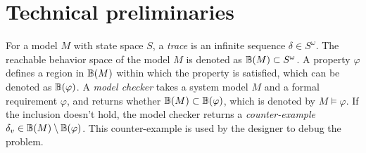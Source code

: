 \section{Technical preliminaries}
\label{preliminaries}
For a model $M$ with state space $S$, a \emph{trace} is an infinite sequence $\delta\in S^\omega$. 
The reachable behavior space of the model $M$ is denoted as $\mathbb{B}(M)\subset S^\omega$. 
A property $\varphi$ defines a region in $\mathbb{B}(M)$ within which the property is satisfied, which can be denoted as $\mathbb{B}(\varphi)$.
A \emph{model checker} takes a system model $M$ and a formal requirement $\varphi$, and returns whether $\mathbb{B}(M) \subset \mathbb{B}(\varphi)$, which is denoted by $M\models\varphi$. 
If the inclusion doesn't hold, the model checker returns a \emph{counter-example} $\delta_v\in\mathbb{B}(M) \setminus \mathbb{B}(\varphi)$.
This counter-example is used by the designer to debug the problem. 

%

